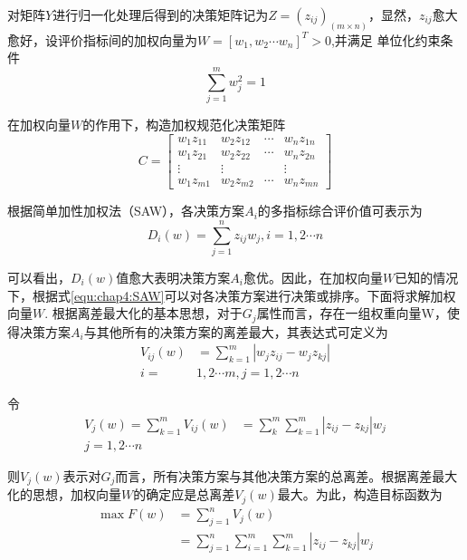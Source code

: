对矩阵$Y$进行归一化处理后得到的决策矩阵记为$Z = (z_{ij})_(m \times n)$，显然，$z_{ij}$愈大愈好，设评价指标间的加权向量为$W = [w_1,w_2 \cdots w_n]^T > 0$,并满足
单位化约束条件
\begin{equation}
  \sum_{j=1}^{m} w_{j}^{2}=1
\end{equation}
  
在加权向量$W$的作用下，构造加权规范化决策矩阵
\begin{equation}
C = \left[\begin{array}{cccc}{w_{1} z_{11}} & {w_{2} z_{12}} & {\cdots} & {w_{n} z_{1 n}} \\ {w_{1} z_{21}} & {w_{2} z_{22}} & {\cdots} & {w_{n} z_{2 n}} \\ 
{\vdots} & {\vdots} & {} & {\vdots} \\ {w_{1} z_{m 1}} & {w_{2} z_{m 2}} & {\cdots} & {w_{n} z_{m n}}\end{array}\right]
\end{equation}

根据简单加性加权法（SAW），各决策方案$A_i$的多指标综合评价值可表示为
\begin{equation}
\label{equ:chap4:SAW}
  D_i(w) = \sum_{j = 1}^{n} z_{ij}w_{j} , i=1,2 \cdots n
\end{equation}

可以看出，$D_i(w)$值愈大表明决策方案$A_i$愈优。因此，在加权向量$W$已知的情况下，根据式\ref{equ:chap4:SAW}可以对各决策方案进行决策或排序。下面将求解加权向量$W$.
根据离差最大化的基本思想，对于$G_j$属性而言，存在一组权重向量W，使得决策方案$A_{i}$与其他所有的决策方案的离差最大，其表达式可定义为
\begin{equation}
\begin{aligned} V_{i j}(w) &=\sum_{k=1}^{m}\left|w_{j} z_{i j}-w_{j} z_{k j}\right| \\ i=& 1,2 \cdots m, j=1,2 \cdots n \end{aligned}
\end{equation}

令
\begin{equation}
\begin{aligned} V_{j}(w)=\sum_{k=1}^{m} V_{i j}(w) &=\sum_{k}^{m} \sum_{k=1}^{m}\left|z_{i j}-z_{k j}\right| w_{j} \\ j=1,2 \cdots n \end{aligned}
\end{equation}

则$V_{j}(w)$表示对$G_{j}$而言，所有决策方案与其他决策方案的总离差。根据离差最大化的思想，加权向量$W$的确定应是总离差$V_{j}(w)$最大。为此，构造目标函数为
\begin{equation}
\label{equ:chap4:licha1}
\begin{aligned} \max F(w) &=\sum_{j=1}^{n} V_{j}(w) \\ &=\sum_{j=1}^{n} \sum_{i=1}^{m} \sum_{k=1}^{m}\left|z_{i j}-z_{k j}\right| w_{j} \end{aligned}
\end{equation}


